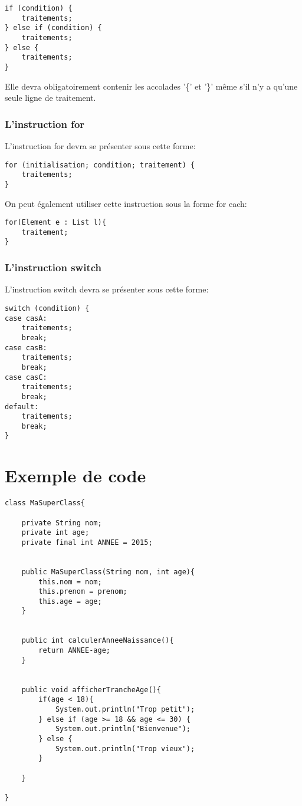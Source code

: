 \documentclass{article}
\begin{document}
\begin{lstlisting}
if (condition) {
	traitements;
} else if (condition) {
	traitements;
} else {
	traitements;
}
\end{lstlisting}

Elle devra obligatoirement contenir les accolades '\{' et '\}' même s'il n'y a qu'une seule ligne de traitement.


\section{L'instruction for}
L'instruction for devra se présenter sous cette forme:

\begin{lstlisting}
for (initialisation; condition; traitement) {
	traitements;
}
\end{lstlisting}

On peut également utiliser cette instruction sous la forme for each:

\begin{lstlisting}
for(Element e : List l){
	traitement;
}
\end{lstlisting}



\section{L'instruction switch}
L'instruction switch devra se présenter sous cette forme:

\begin{lstlisting}
switch (condition) {
case casA:
	traitements;
	break;
case casB:
	traitements;
	break;
case casC:
	traitements;
	break;
default:
	traitements;
	break;
}

\end{lstlisting}

\newpage
{}
\part*{Exemple de code}

\begin{lstlisting}
class MaSuperClass{

	private String nom;
	private int age;
	private final int ANNEE = 2015;


	public MaSuperClass(String nom, int age){
		this.nom = nom;
		this.prenom = prenom;
		this.age = age;
	}


	public int calculerAnneeNaissance(){
		return ANNEE-age;
	}


	public void afficherTrancheAge(){
		if(age < 18){
			System.out.println("Trop petit");
		} else if (age >= 18 && age <= 30) {
			System.out.println("Bienvenue");
		} else {
			System.out.println("Trop vieux");
		}

	}

}

\end{lstlisting}
\end{document}
